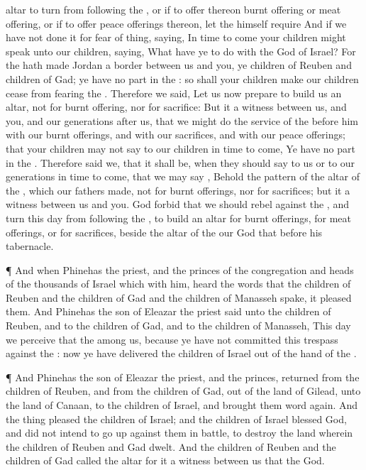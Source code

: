 {altar to
turn from
following the
{}, or if to
offer thereon burnt
offering or meat
offering, or if to
offer
peace
offerings thereon, let the
{} himself
require
{}
And if we have not
{}
done it for
fear of
{}
thing,
saying, In time to
come your
children might
speak unto our
children,
saying, What have ye to do with the
{}
God of
Israel?
For the
{} hath
made
Jordan a
border between us and you, ye
children of
Reuben and
children of
Gad; ye have no
part in the
{}: so shall your
children
make our
children
cease
from
fearing the
{}.
Therefore we
said, Let us now
prepare to
build us an
altar, not for burnt
offering, nor for
sacrifice:
But
{} it
{} a
witness between us, and you, and our
generations
after us, that we might
do the
service of the
{}
before him with our burnt
offerings, and with our
sacrifices, and with our peace
offerings; that your
children may not
say to our
children in time to
come, Ye have no
part in the
{}.
Therefore
said we, that it shall be, when they should
{}
say to us or to our
generations in time to
come, that we may
say
{},
Behold the
pattern of the
altar of the
{}, which our
fathers
made, not for burnt
offerings, nor for
sacrifices; but it
{} a
witness between us and you.
God
forbid that we should
rebel against the
{}, and
turn this
day from
following the
{}, to
build an
altar for burnt
offerings, for meat
offerings, or for
sacrifices, beside the
altar of the
{} our
God that
{}
before his
tabernacle.
\par }{\PP {}¶ And when
Phinehas the
priest, and the
princes of the
congregation and
heads of the
thousands of
Israel which
{} with him,
heard the
words that the
children of
Reuben and the
children of
Gad and the
children of
Manasseh
spake, it
pleased them.
And
Phinehas the
son of
Eleazar the
priest
said unto the
children of
Reuben, and to the
children of
Gad, and to the
children of
Manasseh, This
day we
perceive that the
{}
{}
among us, because ye have not
committed this
trespass against the
{}:
now ye have
delivered the
children of
Israel out of the
hand of the
{}.
\par }{\PP {}¶ And
Phinehas the
son of
Eleazar the
priest, and the
princes,
returned from the
children of
Reuben, and from the
children of
Gad, out of the
land of
Gilead, unto the
land of
Canaan, to the
children of
Israel, and
brought them
word
again.
And the
thing
pleased the
children of
Israel; and the
children of
Israel
blessed
God, and did not
intend to go
up against them in
battle, to
destroy the
land wherein the
children of
Reuben and
Gad
dwelt.
And the
children of
Reuben and the
children of
Gad
called the
altar
{} for it
{} a
witness between us that the
{}
{}
God.

}
